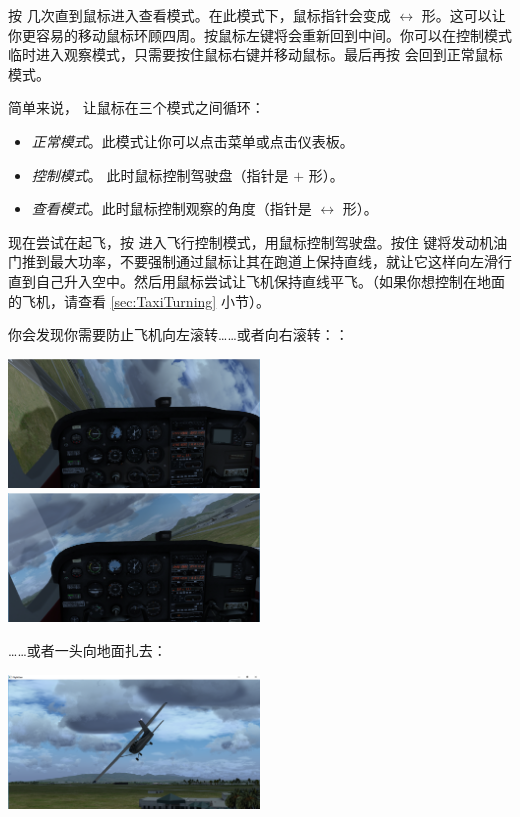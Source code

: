 按  几次直到鼠标进入查看模式。在此模式下，鼠标指针会变成 $\leftrightarrow$ 形。这可以让你更容易的移动鼠标环顾四周。按鼠标左键将会重新回到中间。你可以在控制模式临时进入观察模式，只需要按住鼠标右键并移动鼠标。最后再按  会回到正常鼠标模式。

简单来说， 让鼠标在三个模式之间循环：
\begin{itemize}
    \item \textit{正常模式}。此模式让你可以点击菜单或点击仪表板。
    \item \textit{控制模式}。 此时鼠标控制驾驶盘（指针是 $+$ 形）。
    \item \textit{查看模式}。此时鼠标控制观察的角度（指针是 $\leftrightarrow$ 形）。
\end{itemize}

现在尝试在起飞，按  进入飞行控制模式，用鼠标控制驾驶盘。按住  键将发动机油门推到最大功率，不要强制通过鼠标让其在跑道上保持直线，就让它这样向左滑行直到自己升入空中。然后用鼠标尝试让飞机保持直线平飞。（如果你想控制在地面的飞机，请查看 \ref{sec:TaxiTurning} 小节）。

你会发现你需要防止飞机向左滚转……或者向右滚转：：

\medskip

\centerline{
  \includegraphics[width=0.5\textwidth]{img/basic_tutorial/bank-left}
  \includegraphics[width=0.5\textwidth]{img/basic_tutorial/bank-right}
}
\medskip

……或者一头向地面扎去：

\medskip

\centerline{
  \includegraphics[width=0.5\textwidth]{img/basic_tutorial/crash}
}
\medskip

